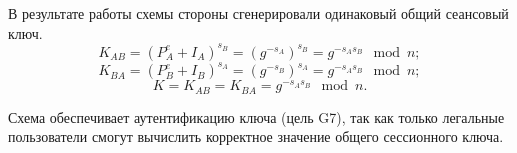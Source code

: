 В результате работы схемы стороны сгенерировали одинаковый общий сеансовый ключ.
\[ K_{AB} = (P_A^e + I_A)^{s_B} = (g^{-s_A})^{s_B} = g^{-s_As_B} \mod n; \]
\[ K_{BA} = (P_B^e + I_B)^{s_A} = (g^{-s_B})^{s_A} = g^{-s_As_B} \mod n; \]
            \[ K = K_{AB} = K_{BA} = g^{-s_As_B} \mod n. \]

Схема обеспечивает аутентификацию ключа (цель G7), так как только легальные пользователи смогут вычислить корректное значение общего сессионного ключа.


